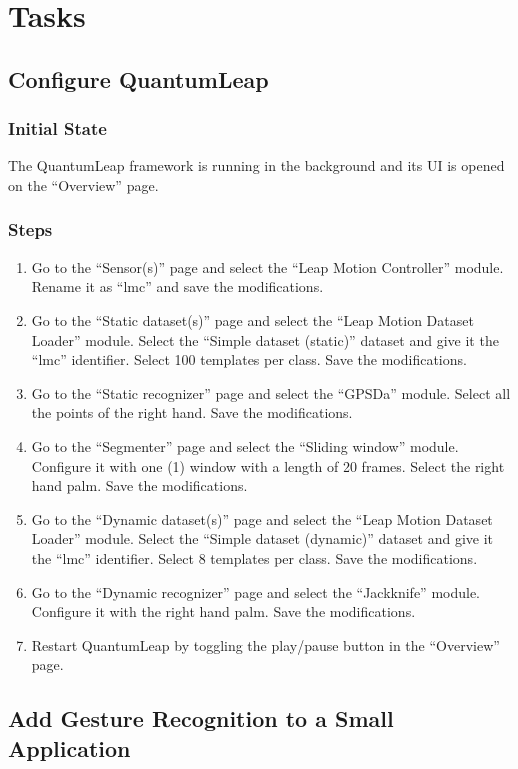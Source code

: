 \newpage
\chapter{Tasks} \label{app:quantumleap-tasks}
\section{Configure QuantumLeap} \label{app:quantumleap-tasks:tasks-config}
\subsection{Initial State}
The QuantumLeap framework is running in the background and its UI is opened on the ``Overview'' page.

\subsection{Steps}
\begin{enumerate}
    \item Go to the ``Sensor(s)'' page and select the ``Leap Motion Controller'' module. Rename it as ``lmc'' and save the modifications.
    \item Go to the ``Static dataset(s)'' page and select the ``Leap Motion Dataset Loader'' module. Select the ``Simple dataset (static)'' dataset and give it the ``lmc'' identifier. Select 100 templates per class. Save the modifications.
    \item Go to the ``Static recognizer'' page and select the ``GPSDa'' module. Select all the points of the right hand. Save the modifications.
    \item Go to the ``Segmenter'' page and select the ``Sliding window'' module. Configure it with one (1) window with a length of 20 frames. Select the right hand palm. Save the modifications.
    \item Go to the ``Dynamic dataset(s)'' page and select the ``Leap Motion Dataset Loader'' module. Select the ``Simple dataset (dynamic)'' dataset and give it the ``lmc'' identifier. Select 8 templates per class. Save the modifications.
    \item Go to the ``Dynamic recognizer'' page and select the ``Jackknife'' module. Configure it with the right hand palm. Save the modifications.
    \item Restart QuantumLeap by toggling the play/pause button in the ``Overview'' page.
\end{enumerate}

\section{Add Gesture Recognition to a Small Application} \label{app:quantumleap-tasks:tasks-dev}
